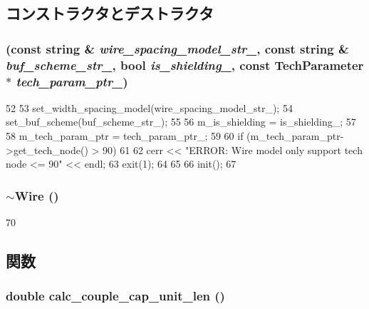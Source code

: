 \subsection{コンストラクタとデストラクタ}
\hypertarget{classWire_a719d9b3019b1898098a4d53bdd05c592}{
\subsubsection[{Wire}]{ (const string \& {\em wire\_\-spacing\_\-model\_\-str\_\-}, \/  const string \& {\em buf\_\-scheme\_\-str\_\-}, \/  bool {\em is\_\-shielding\_\-}, \/  const {\bf TechParameter} $\ast$ {\em tech\_\-param\_\-ptr\_\-})}}
\label{classWire_a719d9b3019b1898098a4d53bdd05c592}



\begin{DoxyCode}
52 {
53     set_width_spacing_model(wire_spacing_model_str_);
54     set_buf_scheme(buf_scheme_str_);
55 
56     m_is_shielding = is_shielding_;
57 
58     m_tech_param_ptr = tech_param_ptr_;
59 
60     if (m_tech_param_ptr->get_tech_node() > 90)
61     {
62         cerr << "ERROR: Wire model only support tech node <= 90" << endl;
63         exit(1);
64     }
65 
66     init();
67 }
\end{DoxyCode}
\hypertarget{classWire_a6449e110e38a170ac1724b7543b160dc}{
\subsubsection[{$\sim$Wire}]{\setlength{\rightskip}{0pt plus 5cm}$\sim${\bf Wire} ()}}
\label{classWire_a6449e110e38a170ac1724b7543b160dc}



\begin{DoxyCode}
70 {}
\end{DoxyCode}


\subsection{関数}
\hypertarget{classWire_ac69573908f0ce2eba5323ef8b8f72257}{
\subsubsection[{calc\_\-couple\_\-cap\_\-unit\_\-len}]{\setlength{\rightskip}{0pt plus 5cm}double calc\_\-couple\_\-cap\_\-unit\_\-len ()}}
\label{classWire_ac69573908f0ce2eba5323ef8b8f72257}



